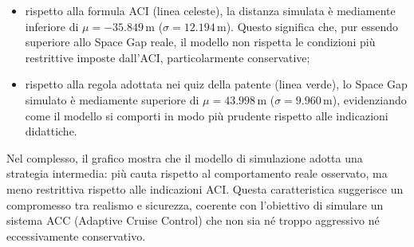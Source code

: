 \begin{itemize}
    \item rispetto alla formula ACI (linea celeste), la distanza simulata è mediamente 
    inferiore di \(\mu = -35.849 \, \mathrm{m}\) (\(\sigma = 12.194 \, \mathrm{m}\)).  
    Questo significa che, pur essendo superiore allo Space Gap reale, il modello non rispetta le condizioni 
    più restrittive imposte dall'ACI, particolarmente conservative;
    \item rispetto alla regola adottata nei quiz della patente (linea verde), lo Space Gap 
    simulato è mediamente superiore di \(\mu = 43.998 \, \mathrm{m}\) (\(\sigma = 9.960 \, \mathrm{m}\)), 
    evidenziando come il modello si comporti in modo più prudente rispetto alle indicazioni didattiche.
\end{itemize}

\noindent  Nel complesso, il grafico mostra che il modello di simulazione adotta una strategia intermedia: 
più cauta rispetto al comportamento reale osservato, ma meno restrittiva rispetto alle indicazioni ACI.  
Questa caratteristica suggerisce un compromesso tra realismo e sicurezza, coerente con l'obiettivo di simulare 
un sistema ACC (Adaptive Cruise Control) che non sia né troppo aggressivo né eccessivamente conservativo.